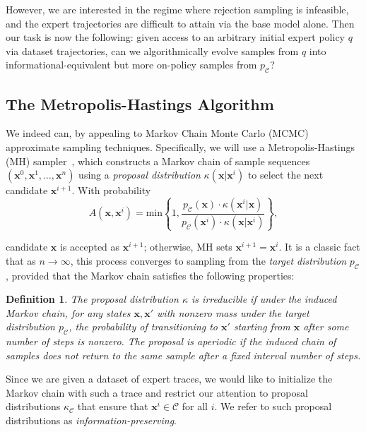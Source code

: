 \documentclass{article}
\newtheorem{definition}{Definition}
\begin{document}
However, we are interested in the regime where rejection sampling is infeasible, and the expert trajectories are difficult to attain via the base model alone. Then our task is now the following: given access to an arbitrary initial expert policy $q$ via dataset trajectories, can we algorithmically evolve samples from $q$ into informational-equivalent but more on-policy samples from $p_{\mathcal{C}}$?


\subsection{The Metropolis-Hastings Algorithm}\label{sec:mh}

We indeed can, by appealing to Markov Chain Monte Carlo (MCMC) approximate sampling techniques. Specifically, we will use a Metropolis-Hastings (MH) sampler~\citep{metropolis1953equation,hastings1970monte}, which constructs a Markov chain of sample sequences $(\mathbf{x}^0, \mathbf{x}^1, \dots, \mathbf{x}^n)$ using a \textit{proposal distribution} $\kappa(\mathbf{x}|\mathbf{x}^i)$ to select the next candidate $\mathbf{x}^{i+1}$. With probability 
% 
\begin{equation}\label{eq:accept}
    A(\mathbf{x}, \mathbf{x}^i) = \text{min} \left\lbrace 1, \frac{p_{\mathcal{C}}(\mathbf{x}) \cdot \kappa(\mathbf{x}^i | \mathbf{x})}{p_{\mathcal{C}}(\mathbf{x}^i) \cdot \kappa(\mathbf{x}|\mathbf{x}^i)}\right\rbrace,
\end{equation}
 
candidate $\mathbf{x}$ is accepted as $\mathbf{x}^{i+1}$; otherwise, MH sets $\mathbf{x}^{i+1} = \mathbf{x}^{i}$.  It is a classic fact that as $n \to \infty$, this process converges to sampling from the \textit{target distribution} $p_{\mathcal{C}}$, provided that the Markov chain satisfies the following properties:

 \begin{definition}
    {\rm The proposal distribution $\kappa$ is \textit{irreducible} if under the induced Markov chain, for any states $\mathbf{x},\mathbf{x}'$ with nonzero mass under the target distribution $p_{\mathcal{C}}$, the probability of transitioning to $\mathbf{x}'$ starting from $\mathbf{x}$ after some number of steps is nonzero. The proposal is \textit{aperiodic} if the induced chain of samples does not return to the same sample after a fixed interval number of steps.}
\end{definition}


Since we are given a dataset of expert traces, we would like to initialize the Markov chain with such a trace and restrict our attention to proposal distributions $\kappa_{\mathcal{C}}$ that ensure that $\mathbf{x}^i \in \mathcal{C}$ for all $i$. We refer to such proposal distributions as \emph{information-preserving}. 
\end{document}
